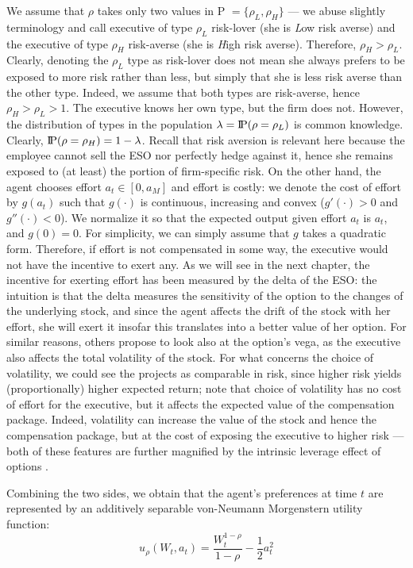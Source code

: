 We assume that $\rho$ takes only two values in P $= \{\rho_L, \rho_H \}$ --- we abuse slightly terminology and call executive of type $\rho_L$ risk-lover (she is \textit{L}ow risk averse) and the executive of type $\rho_H$ risk-averse (she is \textit{H}igh risk averse). Therefore, $\rho_H > \rho_L$. Clearly, denoting the $\rho_L$ type as risk-lover does not mean she always prefers to be exposed to more risk rather than less, but simply that she is less risk averse than the other type. Indeed, we assume that both types are risk-averse, hence $\rho_H > \rho_L > 1$. The executive knows her own type, but the firm does not. However, the distribution of types in the population $\lambda = \text{I\kern-0.15em P}(\rho = \rho_L)$ is common knowledge. Clearly, $\text{I\kern-0.15em P}(\rho = \rho_H) = 1 - \lambda$. Recall that risk aversion is relevant here because the employee cannot sell the ESO nor perfectly hedge against it, hence she remains exposed to (at least) the portion of firm-specific risk.
On the other hand, the agent chooses effort $a_t \in [0, a_M]$ and effort is costly: we denote the cost of effort by $g(a_t)$ such that $g(\cdot)$ is continuous, increasing and convex ($g'(\cdot) > 0$ and $g''(\cdot)<0$). We normalize it so that the expected output given effort $a_t$ is $a_t$, and $g(0) = 0$. For simplicity, we can simply assume that $g$ takes a quadratic form. Therefore, if effort is not compensated in some way, the executive would not have the incentive to exert any. 
As we will see in the next chapter, the incentive for exerting effort has been measured by the delta of the ESO: the intuition is that the delta measures the sensitivity of the option to the changes of the underlying stock, and since the agent affects the drift of the stock with her effort, she will exert it insofar this translates into a better value of her option. For similar reasons, others propose to look also at the option's vega, as the executive also affects the total volatility of the stock. For what concerns the choice of volatility, we could see the projects as comparable in risk, since higher risk yields (proportionally) higher expected return; note that choice of volatility has no cost of effort for the executive, but it affects the expected value of the compensation package. Indeed, volatility can increase the value of the stock and hence the compensation package, but at the cost of exposing the executive to higher risk --- both of these features are further magnified by the intrinsic leverage effect of options \citet{cadenillas2005executive}.

Combining the two sides, we obtain that the agent's preferences at time $t$ are represented by an additively separable von-Neumann Morgenstern utility function:
$$ u_\rho (W_t, a_t) = \frac{W_t^{1-\rho}}{1-\rho} - \frac{1}{2}a_t^2 $$

